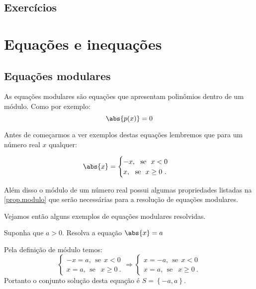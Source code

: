  \section{Exercícios}

\construirExer

 \chapter{Equações e inequações}

 \section{Equações modulares}

 \vskip0.3cm
 \colorbox{azul}{
 \begin{minipage}{0.9\linewidth}
 \begin{center}
  As equações modulares são equações que apresentam polinômios dentro de um módulo. Como por exemplo:
  \[\abs{p(x)}= 0\]
 \end{center}
 \end{minipage}}
 \vskip0.3cm

 Antes de começarmos a ver exemplos destas equações lembremos que para um número real $x$ qualquer:

 \[
\abs{x}= \begin{cases}
      -x, \ \ \text{se} \ \ x<0 \\
      x, \ \ \text{se} \ \ x \geq 0 \ .
     \end{cases}
\]

Além disso o módulo de um número real possui algumas propriedades listadas na \autoref{prop.modulo} que serão necessárias para a resolução de equações modulares.

Vejamos então alguns exemplos de equações modulares resolvidas.

\begin{exem} 
  Suponha que $a> 0$. Resolva a equação $\abs{x}= a$

  Pela definição de módulo temos:
  \[
  \begin{cases}
      -x= a, \ \ \text{se} \ \ x<0 \\
      x= a, \ \ \text{se } \ \ x \geq 0 \ .
     \end{cases}
     \Rightarrow
     \begin{cases}
      x= -a, \ \ \text{se} \ \ x<0 \\
      x= a, \ \ \text{se } \ \ x \geq 0 \ .
     \end{cases}
  \]
 Portanto o conjunto solução desta equação é $S= \left\{-a, a \right\}$.
\end{exem}

